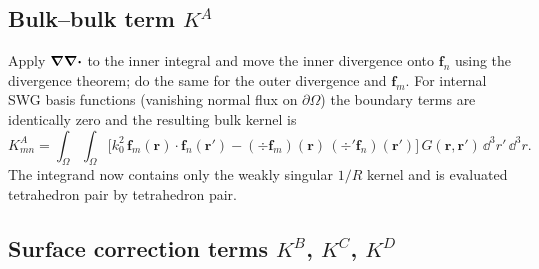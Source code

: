 \documentclass[11pt,a4paper]{article}
\begin{document}
\subsection{Bulk--bulk term $K^{A}$}
\label{sec:K-A}

Apply $\grad\div$ to the inner integral and move the inner divergence
onto $\bm{f}_n$ using the divergence theorem; do the same for the outer
divergence and $\bm{f}_m$. For internal SWG basis functions
(vanishing normal flux on $\partial\Omega$) the boundary terms are
identically zero and the resulting bulk kernel is
\begin{equation}
  K_{mn}^{A}
    = \int_{\Omega}\!\int_{\Omega}
      \bigl[
        k_0^{2}\,\bm{f}_m(\bm{r})\cdot\bm{f}_n(\bm{r}')
        - (\div\bm{f}_m)(\bm{r})\,(\div'\bm{f}_n)(\bm{r}')
      \bigr]\,
      G(\bm{r},\bm{r}')\,\dd^{3}r'\,\dd^{3}r.
  \label{eq:K-A}
\end{equation}
The integrand now contains only the weakly singular $1/R$ kernel and is
evaluated tetrahedron pair by tetrahedron pair.

\subsection{Surface correction terms $K^{B}$, $K^{C}$, $K^{D}$}
\label{sec:K-BCD}
\end{document}
